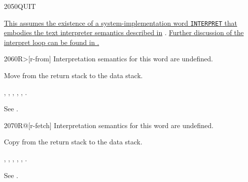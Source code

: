 \begin{worddef}{2050}{QUIT}
\begin{implement}
		\dffamily
\uline{%
		This assumes the existence of a system-implementation word
		{\tt INTERPRET} that embodies the text interpreter semantics described in}
		.
\uline{Further discussion of the interpret loop can be found in .}
\cbend
	\end{implement}
\end{worddef}


\begin{worddef}[Rfrom]{2060}{R>}[r-from]
\interpret
	Interpretation semantics for this word are undefined.

\execute

	Move  from the return stack to the data stack.

\see {},
	,
	,
	,
	,
	.

	\begin{testing} %
		See .
	\end{testing}
\end{worddef}


\begin{worddef}{2070}{R@}[r-fetch]
\interpret
	Interpretation semantics for this word are undefined.

\execute

	Copy  from the return stack to the data stack.

\see {},
	,
	,
	,
	,
	.

	\begin{testing} %
		See .
	\end{testing}
\end{worddef}


